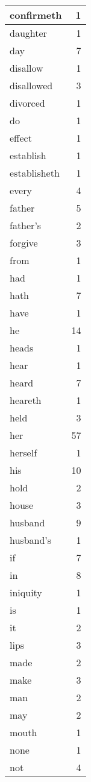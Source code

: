 \begin{center}
\begin{longtable}{l|r}
confirmeth & 1\\ \hline 
daughter & 1\\ \hline 
day & 7\\ \hline 
disallow & 1\\ \hline 
disallowed & 3\\ \hline 
divorced & 1\\ \hline 
do & 1\\ \hline 
effect & 1\\ \hline 
establish & 1\\ \hline 
establisheth & 1\\ \hline 
every & 4\\ \hline 
father & 5\\ \hline 
father's & 2\\ \hline 
forgive & 3\\ \hline 
from & 1\\ \hline 
had & 1\\ \hline 
hath & 7\\ \hline 
have & 1\\ \hline 
he & 14\\ \hline 
heads & 1\\ \hline 
hear & 1\\ \hline 
heard & 7\\ \hline 
heareth & 1\\ \hline 
held & 3\\ \hline 
her & 57\\ \hline 
herself & 1\\ \hline 
his & 10\\ \hline 
hold & 2\\ \hline 
house & 3\\ \hline 
husband & 9\\ \hline 
husband's & 1\\ \hline 
if & 7\\ \hline 
in & 8\\ \hline 
iniquity & 1\\ \hline 
is & 1\\ \hline 
it & 2\\ \hline 
lips & 3\\ \hline 
made & 2\\ \hline 
make & 3\\ \hline 
man & 2\\ \hline 
may & 2\\ \hline 
mouth & 1\\ \hline 
none & 1\\ \hline 
not & 4\\ \hline 

\end{longtable}
\end{center}
